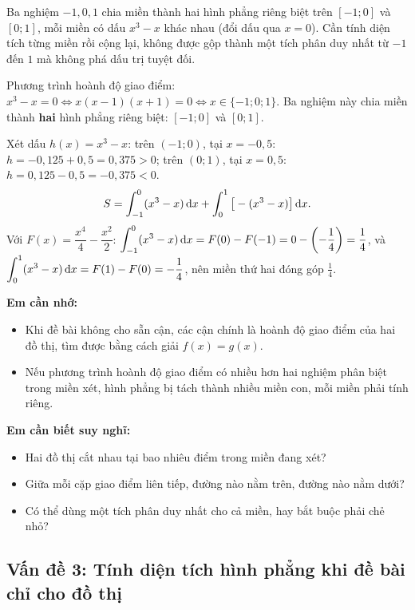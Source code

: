 \begin{hopyduong}
Ba nghiệm $-1, 0, 1$ chia miền thành hai hình phẳng riêng biệt trên $[-1;0]$ và $[0;1]$, mỗi miền có dấu $x^3-x$ khác nhau (đổi dấu qua $x=0$). Cần tính diện tích từng miền rồi cộng lại, không được gộp thành một tích phân duy nhất từ $-1$ đến $1$ mà không phá dấu trị tuyệt đối.
\end{hopyduong}

\begin{loigiai}
Phương trình hoành độ giao điểm: $x^3-x=0 \Leftrightarrow x(x-1)(x+1)=0 \Leftrightarrow x\in\{-1;0;1\}$. Ba nghiệm này chia miền thành \textbf{hai} hình phẳng riêng biệt: $[-1;0]$ và $[0;1]$.

Xét dấu $h(x)=x^3-x$: trên $(-1;0)$, tại $x=-0{,}5$: $h=-0{,}125+0{,}5=0{,}375>0$; trên $(0;1)$, tại $x=0{,}5$: $h=0{,}125-0{,}5=-0{,}375<0$.
\[
S=\int_{-1}^{0}(x^3-x)\,\mathrm{d}x + \int_0^1 \big[-(x^3-x)\big]\,\mathrm{d}x.
\]
Với $F(x)=\dfrac{x^4}{4}-\dfrac{x^2}{2}$: $\displaystyle\int_{-1}^0(x^3-x)\,\mathrm{d}x = F(0)-F(-1)=0-\left(-\frac14\right)=\frac14$, và $\displaystyle\int_0^1(x^3-x)\,\mathrm{d}x=F(1)-F(0)=-\frac14$, nên miền thứ hai đóng góp $\frac14$.
\end{loigiai}

\begin{hoptongket}
\textbf{Em cần nhớ:}
\begin{itemize}[leftmargin=1cm]
  \item Khi đề bài không cho sẵn cận, các cận chính là hoành độ giao điểm của hai đồ thị, tìm được bằng cách giải $f(x)=g(x)$.
  \item Nếu phương trình hoành độ giao điểm có nhiều hơn hai nghiệm phân biệt trong miền xét, hình phẳng bị tách thành nhiều miền con, mỗi miền phải tính riêng.
\end{itemize}
\textbf{Em cần biết suy nghĩ:}
\begin{itemize}[leftmargin=1cm]
  \item Hai đồ thị cắt nhau tại bao nhiêu điểm trong miền đang xét?
  \item Giữa mỗi cặp giao điểm liên tiếp, đường nào nằm trên, đường nào nằm dưới?
  \item Có thể dùng một tích phân duy nhất cho cả miền, hay bắt buộc phải chẻ nhỏ?
\end{itemize}
\end{hoptongket}
\subsection{Vấn đề 3: Tính diện tích hình phẳng khi đề bài chỉ cho đồ thị}

